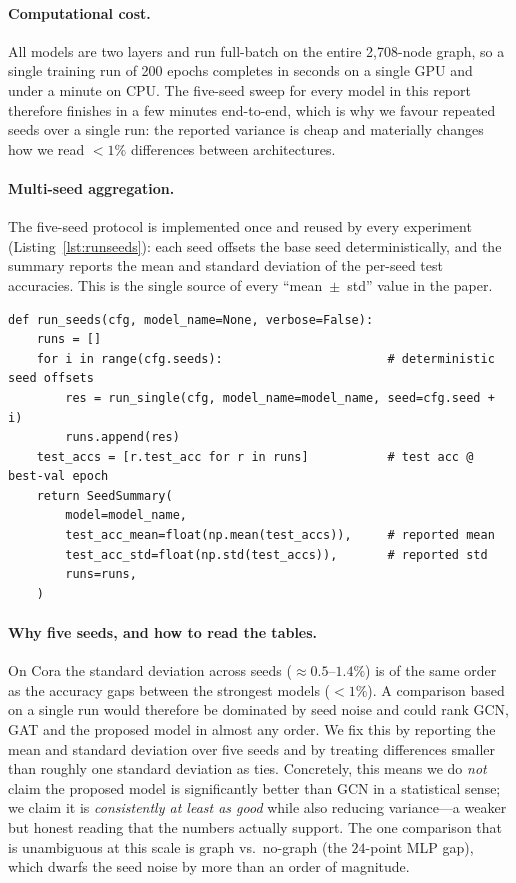 \documentclass{article}
\begin{document}
\paragraph{Computational cost.} All models are two layers and run full-batch on the
entire 2{,}708-node graph, so a single training run of 200 epochs completes in seconds
on a single GPU and under a minute on CPU. The five-seed sweep for every model in this
report therefore finishes in a few minutes end-to-end, which is why we favour repeated
seeds over a single run: the reported variance is cheap and materially changes how we
read $<1\%$ differences between architectures.

\paragraph{Multi-seed aggregation.} The five-seed protocol is implemented once and
reused by every experiment (Listing~\ref{lst:runseeds}): each seed offsets the base seed
deterministically, and the summary reports the mean and standard deviation of the
per-seed test accuracies. This is the single source of every ``mean~$\pm$~std'' value in
the paper.

\begin{lstlisting}[caption={Multi-seed aggregation (\texttt{src/training/runner.py}).},label={lst:runseeds}]
def run_seeds(cfg, model_name=None, verbose=False):
    runs = []
    for i in range(cfg.seeds):                       # deterministic seed offsets
        res = run_single(cfg, model_name=model_name, seed=cfg.seed + i)
        runs.append(res)
    test_accs = [r.test_acc for r in runs]           # test acc @ best-val epoch
    return SeedSummary(
        model=model_name,
        test_acc_mean=float(np.mean(test_accs)),     # reported mean
        test_acc_std=float(np.std(test_accs)),       # reported std
        runs=runs,
    )
\end{lstlisting}

\paragraph{Why five seeds, and how to read the tables.} On Cora the standard deviation
across seeds ($\approx 0.5$--$1.4\%$) is of the same order as the accuracy gaps between
the strongest models ($<1\%$). A comparison based on a single run would therefore be
dominated by seed noise and could rank GCN, GAT and the proposed model in almost any
order. We fix this by reporting the mean and standard deviation over five seeds and by
treating differences smaller than roughly one standard deviation as ties. Concretely,
this means we do \emph{not} claim the proposed model is significantly better than GCN in
a statistical sense; we claim it is \emph{consistently at least as good} while also
reducing variance---a weaker but honest reading that the numbers actually support. The
one comparison that is unambiguous at this scale is graph vs.\ no-graph (the $24$-point
MLP gap), which dwarfs the seed noise by more than an order of magnitude.
\end{document}
